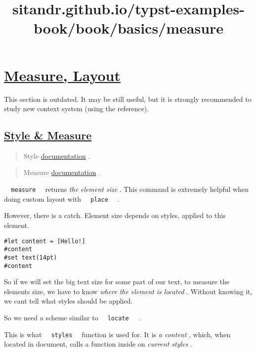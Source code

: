 \title{sitandr.github.io/typst-examples-book/book/basics/measure}

\section{\texorpdfstring{\hyperref[measure-layout]{Measure,
Layout}}{Measure, Layout}}\label{measure-layout}

This section is outdated. It may be still useful, but it is strongly
recommended to study new context system (using the reference).

\subsection{\texorpdfstring{\hyperref[style--measure]{Style \&
Measure}}{Style \& Measure}}\label{style--measure}

\begin{quote}
Style
\href{https://typst.app/docs/reference/foundations/style/}{documentation}
.
\end{quote}

\begin{quote}
Measure
\href{https://typst.app/docs/reference/layout/measure/}{documentation} .
\end{quote}

\texttt{\ }{\texttt{\ measure\ }}\texttt{\ } returns \emph{the element
size} . This command is extremely helpful when doing custom layout with
\texttt{\ }{\texttt{\ place\ }}\texttt{\ } .

However, there is a catch. Element size depends on styles, applied to
this element.

\begin{verbatim}
#let content = [Hello!]
#content
#set text(14pt)
#content
\end{verbatim}

\pandocbounded{}

So if we will set the big text size for some part of our text, to
measure the element\textquotesingle s size, we have to know \emph{where
the element is located} . Without knowing it, we can\textquotesingle t
tell what styles should be applied.

So we need a scheme similar to
\texttt{\ }{\texttt{\ locate\ }}\texttt{\ } .

This is what \texttt{\ }{\texttt{\ styles\ }}\texttt{\ } function is
used for. It is \emph{a content} , which, when located in document,
calls a function inside on \emph{current styles} .

